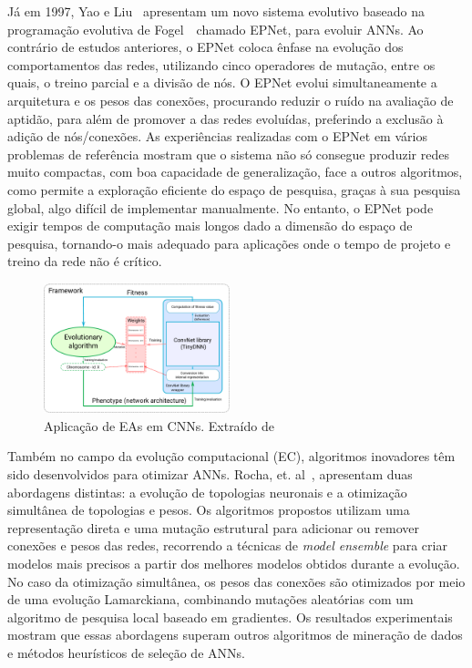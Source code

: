 Já em 1997, Yao e Liu~\cite{Yao1997ANetworks} apresentam um novo sistema evolutivo baseado na programação evolutiva de Fogel~\cite{Fogel1990EvolvingNetworks}\, chamado EPNet, para evoluir ANNs. Ao contrário de estudos anteriores, o EPNet coloca ênfase na evolução dos comportamentos das redes, utilizando cinco operadores de mutação, entre os quais, o treino parcial e a divisão de nós.
O EPNet evolui simultaneamente a arquitetura e os pesos das conexões, procurando reduzir o ruído na avaliação de aptidão, para além de promover a  das redes evoluídas, preferindo a exclusão à adição de nós/conexões.
As experiências realizadas com o EPNet em vários problemas de referência mostram que o sistema não só consegue produzir redes muito compactas, com boa capacidade de generalização, face a outros algoritmos, como permite a exploração eficiente do espaço de pesquisa, graças à sua pesquisa global, algo difícil de implementar manualmente.
No entanto, o EPNet pode exigir tempos de computação mais longos dado a dimensão do espaço de pesquisa, tornando-o mais adequado para aplicações onde o tempo de projeto e treino da rede não é crítico.

\begin{figure}[htbp]
    \centering
    \includegraphics[width=0.48\textwidth]{imagens/evo_alg3}
    \caption{Aplicação de EAs em CNNs. Extraído de \cite{Badan2019EvolutionaryDesign}}
    \label{fig:evo_alg_cnn}
\end{figure}

Também no campo da evolução computacional (EC), algoritmos inovadores têm sido desenvolvidos para otimizar ANNs. Rocha, et.
al~\cite{Rocha2007EvolutionRegression}, apresentam duas abordagens distintas: a evolução de topologias neuronais e a otimização simultânea de topologias e pesos.
Os algoritmos propostos utilizam uma representação direta e uma mutação estrutural para adicionar ou remover conexões e pesos das redes, recorrendo a técnicas de \textit{model ensemble} para criar modelos mais precisos a partir dos melhores modelos obtidos durante a evolução.
No caso da otimização simultânea, os pesos das conexões são otimizados por meio de uma evolução Lamarckiana, combinando mutações aleatórias com um algoritmo de pesquisa local baseado em gradientes.
Os resultados experimentais mostram que essas abordagens superam outros algoritmos de mineração de dados e métodos heurísticos de seleção de ANNs.

